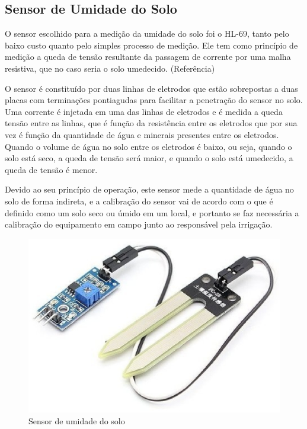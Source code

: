  \subsection{Sensor de Umidade do Solo}

  O sensor escolhido para a medição da umidade do solo foi o HL-69, tanto pelo baixo custo quanto pelo simples processo de medição. Ele tem como princípio de medição a queda de tensão resultante da passagem de corrente por uma malha resistiva, que no caso seria o solo umedecido. (Referência)
 
  O sensor é constituído por duas linhas de eletrodos que estão sobrepostas a duas placas com terminações pontiagudas para facilitar a penetração do sensor no solo. Uma corrente é injetada em uma das linhas de eletrodos e é medida a queda tensão entre as linhas, que é função da resistência entre os eletrodos que por sua vez é função da quantidade de água e minerais presentes entre os eletrodos. Quando o volume de água no solo entre os eletrodos é baixo, ou seja, quando o solo está seco, a queda de tensão será maior, e quando o solo está umedecido, a queda de tensão é menor.
 
  Devido ao seu princípio de operação, este sensor mede a quantidade de água no solo de forma indireta, e a calibração do sensor vai de acordo com o que é definido como um solo seco ou úmido em um local, e portanto se faz necessária a calibração do equipamento em campo junto ao responsável pela irrigação.

  \begin{figure}[!htbp]
  \begin{center}
  \includegraphics[keepaspectratio=true,scale=0.3]{figuras/higrometer.eps}
  \caption{\label{DHT11}Sensor de umidade do solo}
  \end{center}
  \end{figure}


